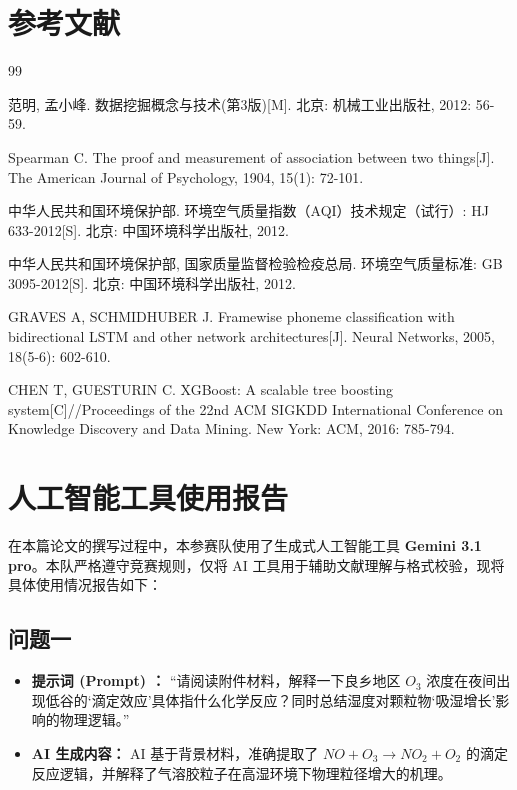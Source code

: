 \documentclass[a4paper, 12pt]{ctexart} %
\begin{document}
\section{参考文献}
\renewcommand{\refname}{} 
\vspace{-3.5em} 
\begin{thebibliography}{99}

 范明, 孟小峰. 数据挖掘概念与技术(第3版)[M]. 北京: 机械工业出版社, 2012: 56-59.

 Spearman C. The proof and measurement of association between two things[J]. The American Journal of Psychology, 1904, 15(1): 72-101.

 中华人民共和国环境保护部. 环境空气质量指数（AQI）技术规定（试行）: HJ 633-2012[S]. 北京: 中国环境科学出版社, 2012.

 中华人民共和国环境保护部, 国家质量监督检验检疫总局. 环境空气质量标准: GB 3095-2012[S]. 北京: 中国环境科学出版社, 2012.

 GRAVES A, SCHMIDHUBER J. Framewise phoneme classification with bidirectional LSTM and other network architectures[J]. Neural Networks, 2005, 18(5-6): 602-610.

 CHEN T, GUESTURIN C. XGBoost: A scalable tree boosting system[C]//Proceedings of the 22nd ACM SIGKDD International Conference on Knowledge Discovery and Data Mining. New York: ACM, 2016: 785-794.
\end{thebibliography}

\section{人工智能工具使用报告}
在本篇论文的撰写过程中，本参赛队使用了生成式人工智能工具 \textbf{Gemini 3.1 pro}。本队严格遵守竞赛规则，仅将 AI 工具用于辅助文献理解与格式校验，现将具体使用情况报告如下：
\subsection{问题一}
\begin{itemize}[itemsep=0pt, parsep=0pt]
    \item \textbf{提示词 (Prompt) ：} “请阅读附件材料，解释一下良乡地区 $O_3$ 浓度在夜间出现低谷的‘滴定效应’具体指什么化学反应？同时总结湿度对颗粒物‘吸湿增长’影响的物理逻辑。”
    \item \textbf{AI 生成内容：} AI 基于背景材料，准确提取了 $NO + O_3 \rightarrow NO_2 + O_2$ 的滴定反应逻辑，并解释了气溶胶粒子在高湿环境下物理粒径增大的机理。
\end{itemize}
\end{document}
